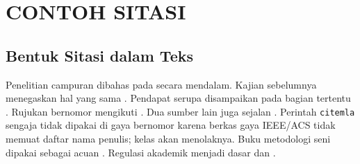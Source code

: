 \documentclass[sitasi=ieee,logodir=../../logo,logo=logo-placeholder]{unnes-ta}
\begin{document}
\bagianutama

\chapter{CONTOH SITASI}
\section{Bentuk Sitasi dalam Teks}
Penelitian campuran dibahas pada \cite{creswell2018research} secara mendalam.
Kajian sebelumnya menegaskan hal yang sama \citep{martin2014write}.
Pendapat serupa disampaikan pada bagian tertentu \citep[955]{martin2014write}.
Rujukan bernomor mengikuti \cite{geraldi2017project}.
Dua sumber lain juga sejalan \citep{febriani2020memahami,shils1993etika}.
Perintah \texttt{citemla} sengaja tidak dipakai di gaya bernomor karena berkas gaya IEEE/ACS tidak memuat daftar nama penulis; kelas akan menolaknya.
Buku metodologi seni dipakai sebagai acuan \citep{rohidi2012research}.
Regulasi akademik menjadi dasar \citep{permendikbudristek2023} dan
\citep{unnes2024panduanakademik}.

\end{document}
